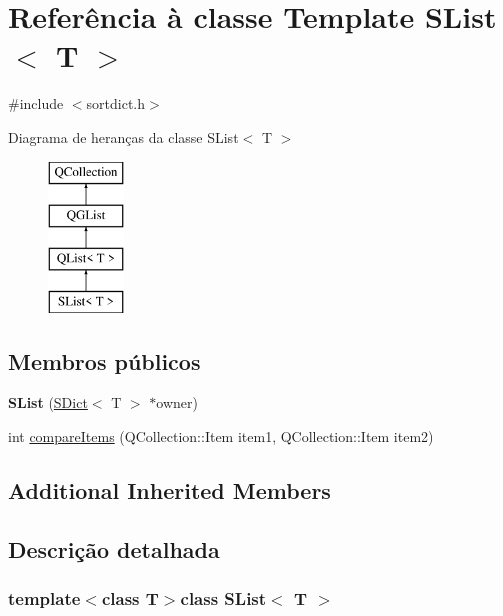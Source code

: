 \hypertarget{class_s_list}{\section{Referência à classe Template S\-List$<$ T $>$}
\label{class_s_list}
}


{\ttfamily \#include $<$sortdict.\-h$>$}

Diagrama de heranças da classe S\-List$<$ T $>$\begin{figure}[H]
\begin{center}
\leavevmode
\includegraphics[height=4.000000cm]{class_s_list}
\end{center}
\end{figure}
\subsection*{Membros públicos}
\begin{DoxyCompactItemize}
\item 
\hypertarget{class_s_list_a874e1b986f972cdcc5c828e562e0b861}{{\bfseries S\-List} (\hyperlink{class_s_dict}{S\-Dict}$<$ T $>$ $\ast$owner)}\label{class_s_list_a874e1b986f972cdcc5c828e562e0b861}

\item 
int \hyperlink{class_s_list_a219450accf048597ffc7113ecde4c402}{compare\-Items} (Q\-Collection\-::\-Item item1, Q\-Collection\-::\-Item item2)
\end{DoxyCompactItemize}
\subsection*{Additional Inherited Members}


\subsection{Descrição detalhada}
\subsubsection*{template$<$class T$>$class S\-List$<$ T $>$}

